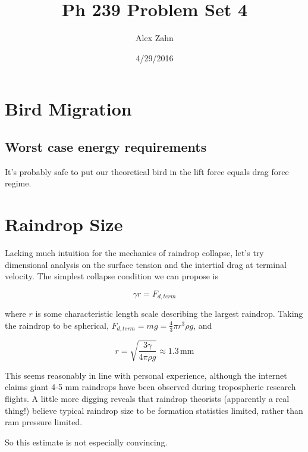 \documentclass[12pt]{article}
\title{Ph 239 Problem Set 4}
\author{Alex Zahn}
\date{4/29/2016}
\begin{document}
\maketitle

\newcommand{\wmsq}{W/\(\mathrm{m}^2\,\)}
\newcommand{\msq}{\(\mathrm{m}^2\,\)}
\newcommand{\micron}{\(\mu\mathrm{m}\)\,}
\newcommand{\mcb}{\(\mathrm{m}^3\,\)}

\section{Bird Migration}

\subsection{Worst case energy requirements}

It's probably safe to put our theoretical bird in the lift force equals drag force regime. 


\section{Raindrop Size}

Lacking much intuition for the mechanics of raindrop collapse, let's try dimensional analysis on the surface tension and the intertial drag at terminal velocity. The simplest collapse condition we can propose is 

\[ \gamma r = F_{d,term}
\]

where \(r\) is some characteristic length scale describing the largest raindrop. Taking the raindrop to be spherical, \(F_{d,term} = mg = \frac{4}{3}\pi r^3 \rho g\), and

\[ r = \sqrt{\frac{3\gamma}{4\pi\rho g}} \approx 1.3 \, \mathrm{mm}
\]

This seems reasonably in line with personal experience, although the internet claims giant 4-5 mm raindrops have been observed during tropospheric research flights. A little more digging reveals that raindrop theorists (apparently a real thing!) believe typical raindrop size to be formation statistics limited, rather than ram pressure limited.

So this estimate is not especially convincing. 
\end{document}
